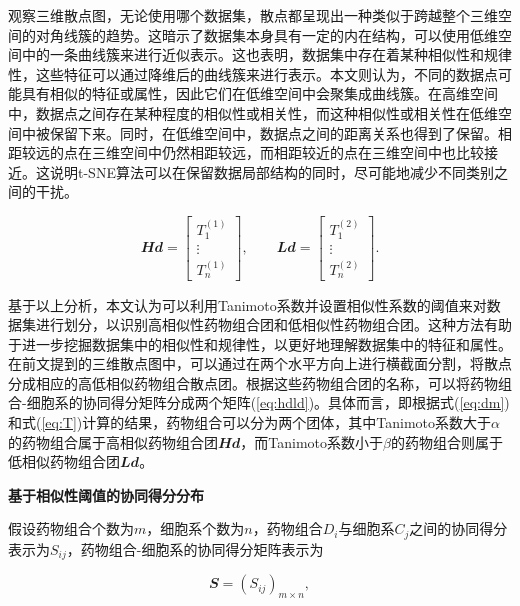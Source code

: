 观察三维散点图，无论使用哪个数据集，散点都呈现出一种类似于跨越整个三维空间的对角线簇的趋势。这暗示了数据集本身具有一定的内在结构，可以使用低维空间中的一条曲线簇来进行近似表示。这也表明，数据集中存在着某种相似性和规律性，这些特征可以通过降维后的曲线簇来进行表示。本文则认为，不同的数据点可能具有相似的特征或属性，因此它们在低维空间中会聚集成曲线簇。在高维空间中，数据点之间存在某种程度的相似性或相关性，而这种相似性或相关性在低维空间中被保留下来。同时，在低维空间中，数据点之间的距离关系也得到了保留。相距较远的点在三维空间中仍然相距较远，而相距较近的点在三维空间中也比较接近。这说明t-SNE算法可以在保留数据局部结构的同时，尽可能地减少不同类别之间的干扰。

\vspace{-1em}

\begin{equation}
\mathbfit{Hd} = \begin{bmatrix} T_1^{(1)} \\ \vdots \\ T_n^{(1)} \end{bmatrix}, \qquad 
\mathbfit{Ld} = \begin{bmatrix} T_1^{(2)} \\ \vdots \\ T_n^{(2)} \end{bmatrix}.
\label{eq:hdld}
\end{equation}

基于以上分析，本文认为可以利用Tanimoto系数并设置相似性系数的阈值来对数据集进行划分，以识别高相似性药物组合团和低相似性药物组合团。这种方法有助于进一步挖掘数据集中的相似性和规律性，以更好地理解数据集中的特征和属性。在前文提到的三维散点图中，可以通过在两个水平方向上进行横截面分割，将散点分成相应的高\texttt{}低相似药物组合散点团。根据这些药物组合团的名称，可以将药物组合-细胞系的协同得分矩阵分成两个矩阵(\ref{eq:hdld})。具体而言，即根据式(\ref{eq:dm})和式(\ref{eq:T})计算的结果，药物组合可以分为两个团体，其中Tanimoto系数大于$α$的药物组合属于高相似药物组合团$\mathbfit{Hd}$，而Tanimoto系数小于$β$的药物组合则属于低相似药物组合团$\mathbfit{Ld}$。

\textbf{基于相似性阈值的协同得分分布}

假设药物组合个数为$m$，细胞系个数为$n$，药物组合$D_i$与细胞系$C_j$之间的协同得分表示为$S_{ij}$，药物组合-细胞系的协同得分矩阵表示为

\vspace{-1em}

\begin{equation}
\mathbfit{S} = (S_{ij})_{m\times n},
\end{equation}

